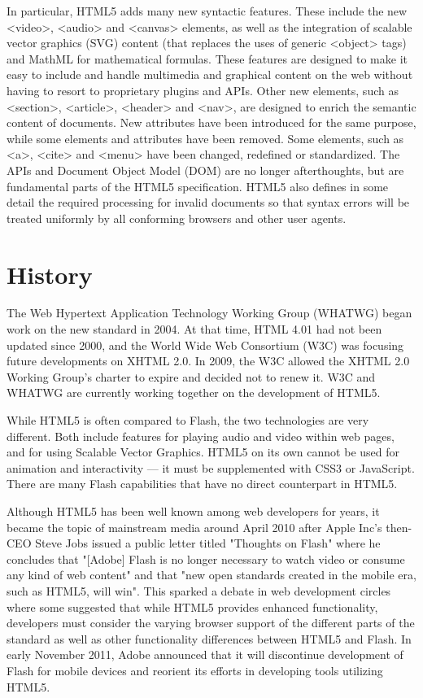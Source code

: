 In particular, HTML5 adds many new syntactic features. These include the new <video>, <audio> and <canvas> elements, as well as the integration of scalable vector graphics (SVG) content (that replaces the uses of generic <object> tags) and MathML for mathematical formulas. These features are designed to make it easy to include and handle multimedia and graphical content on the web without having to resort to proprietary plugins and APIs. Other new elements, such as <section>, <article>, <header> and <nav>, are designed to enrich the semantic content of documents. New attributes have been introduced for the same purpose, while some elements and attributes have been removed. Some elements, such as <a>, <cite> and <menu> have been changed, redefined or standardized. The APIs and Document Object Model (DOM) are no longer afterthoughts, but are fundamental parts of the HTML5 specification. HTML5 also defines in some detail the required processing for invalid documents so that syntax errors will be treated uniformly by all conforming browsers and other user agents.

\chapter{History}

The Web Hypertext Application Technology Working Group (WHATWG) began work on the new standard in 2004. At that time, HTML 4.01 had not been updated since 2000, and the World Wide Web Consortium (W3C) was focusing future developments on XHTML 2.0. In 2009, the W3C allowed the XHTML 2.0 Working Group's charter to expire and decided not to renew it. W3C and WHATWG are currently working together on the development of HTML5.

While HTML5 is often compared to Flash, the two technologies are very different. Both include features for playing audio and video within web pages, and for using Scalable Vector Graphics. HTML5 on its own cannot be used for animation and interactivity — it must be supplemented with CSS3 or JavaScript. There are many Flash capabilities that have no direct counterpart in HTML5. 

Although HTML5 has been well known among web developers for years, it became the topic of mainstream media around April 2010 after Apple Inc's then-CEO Steve Jobs issued a public letter titled "Thoughts on Flash" where he concludes that "[Adobe] Flash is no longer necessary to watch video or consume any kind of web content" and that "new open standards created in the mobile era, such as HTML5, will win". This sparked a debate in web development circles where some suggested that while HTML5 provides enhanced functionality, developers must consider the varying browser support of the different parts of the standard as well as other functionality differences between HTML5 and Flash. In early November 2011, Adobe announced that it will discontinue development of Flash for mobile devices and reorient its efforts in developing tools utilizing HTML5.


